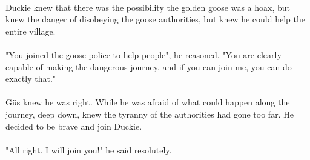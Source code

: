 \paragraph{} Duckie knew that there was the possibility the golden goose was a hoax, but knew the danger of disobeying the goose authorities, but knew he could help the entire village. 
\paragraph{} "You joined the goose police to help people", he reasoned. "You are clearly capable of making the dangerous journey, and if you can join me, you can do exactly that."
\paragraph{} G{\"u}s knew he was right. While he was afraid of what could happen along the journey, deep down, knew the tyranny of the authorities had gone too far. He decided to be brave and join Duckie. 
\paragraph{} "All right. I will join you!" he said resolutely. 